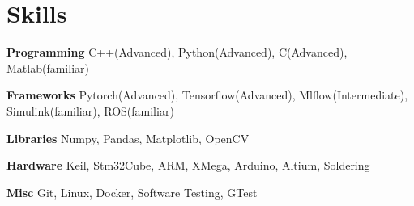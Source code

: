 
\section{Skills}
  \vspace{2pt}
  \resumeSubHeadingListStart
    \small{\item{

    \textbf{\color{MidnightBlue}Programming}{ C++(Advanced), Python(Advanced), C(Advanced), Matlab(familiar)} \\ \vspace{3pt} %

    \textbf{\color{MidnightBlue}Frameworks}{ Pytorch(Advanced), Tensorflow(Advanced), Mlflow(Intermediate)}, Simulink(familiar), ROS(familiar) \\ \vspace{3pt}

    \textbf{\color{MidnightBlue}Libraries}{ Numpy, Pandas, Matplotlib, OpenCV} \\ \vspace{3pt} %

    \textbf{\color{MidnightBlue}Hardware}{ Keil, Stm32Cube, ARM, XMega, Arduino, Altium, Soldering} \\ \vspace{3pt}


    \textbf{\color{MidnightBlue}Misc}{ Git, Linux, Docker, Software Testing, GTest} \\ \vspace{3pt} %
            
    }}
  \resumeSubHeadingListEnd
